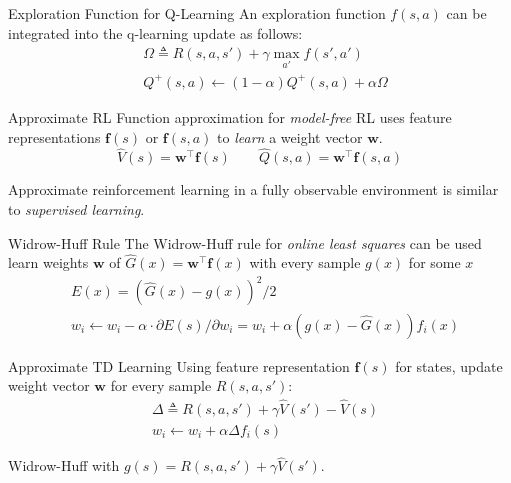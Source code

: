 \documentclass{cognito}
\begin{document}
\begin{note}{Exploration Function for Q-Learning}
	An exploration function $f(s, a)$ can be integrated into the q-learning update
	as follows:
	\begin{align*}
		&\textstyle \Omega \triangleq R(s, a, s') + \gamma \max_{a'} f(s',a')\\
		&\textstyle Q^+(s,a) \leftarrow (1 - \alpha) Q^+(s,a) + \alpha \Omega 
	\end{align*}
	\vspace{-10pt}
\end{note}



\begin{note}{Approximate RL}
	Function approximation for \emph{model-free} RL uses feature representations $\mathbf{f}(s)$
	or $\mathbf{f}(s,a)$ to \emph{learn} a weight vector $\mathbf{w}$.
	$$ \hat{V}(s) = \mathbf{w}^\top \mathbf{f}(s) \quad\quad \hat{Q}(s,a) =  \mathbf{w}^\top \mathbf{f}(s,a) $$
	\begin{remark} Approximate reinforcement learning in a fully observable environment is similar to \emph{supervised learning}.
	\end{remark}
	\vspace{-5pt}
\end{note}

\begin{note}{Widrow-Huff Rule}
	The Widrow-Huff rule for \emph{online least squares} can be used learn weights $\mathbf{w}$ of $\hat{G}(x) = \mathbf{w}^\top \mathbf{f}(x)$
	with every sample $g(x)$ for some $x$
	\begin{align*}
		& \textstyle E(x) =(\hat{G}(x) - g(x))^2 / 2\\
		& \textstyle w_i \leftarrow w_i - \alpha \cdot \partial E(s)/\partial w_i = w_i + \alpha (g(x) - \hat{G}(x)) f_i(x)
	\end{align*}
	\vspace{-10pt}
\end{note}

\begin{note}{Approximate TD Learning}
	Using feature representation $\mathbf{f}(s)$ for states, update weight vector $\mathbf{w}$
	for every sample $R(s, a, s')$:
	\begin{align*}
		&\textstyle \Delta \triangleq R(s, a, s') + \gamma \hat{V}(s') - \hat{V}(s)\\
		&\textstyle w_i \leftarrow w_i + \alpha \Delta f_i(s)
	\end{align*}%
	\begin{remark} Widrow-Huff with $g(s) = R(s, a, s') + \gamma \hat{V}(s')$.\end{remark}
	\vspace{-5pt}
\end{note}
\end{document}
